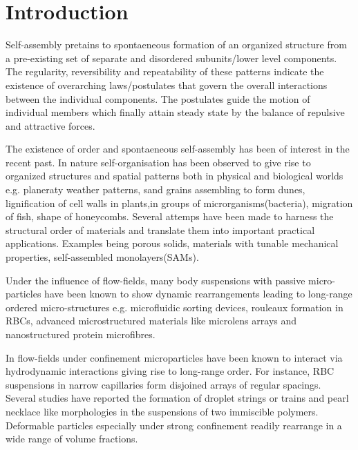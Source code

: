 \chapter{Introduction}

Self-assembly pretains to spontaeneous formation of an organized structure from a pre-existing set of separate and disordered subunits/lower level components. The regularity, reversibility\cite{Reference13} and repeatability of these patterns indicate the existence of overarching laws/postulates that govern the overall interactions between the individual components. The postulates guide the motion of individual members which finally attain steady state by the balance of repulsive and attractive forces\cite{Reference11}.   

The existence of order and spontaeneous self-assembly has been of interest in the recent past\cite{Reference1}. In nature self-organisation has been observed to give rise to organized structures and spatial patterns both in physical and biological worlds\cite{Reference5}\cite{Reference6} e.g. planeraty weather patterns\cite{Reference11}, sand grains assembling to form dunes, lignification of cell walls in plants\cite{Reference2}\cite{Reference3}\cite{Reference4},in groups of microrganisms(bacteria), migration of fish\cite{Reference5}\cite{Reference6}, shape of honeycombs\cite{Reference7}\cite{Reference8}. Several attemps have been made to harness the structural order of materials and translate them into important practical applications. Examples being porous solids, materials with tunable mechanical properties\cite{Reference9}\cite{Reference10}, self-assembled monolayers(SAMs)\cite{Reference34}\cite{Reference35}.

Under the influence of flow-fields, many body suspensions with passive micro-particles have been known to show dynamic rearrangements leading to long-range ordered micro-structures e.g. microfluidic sorting devices, rouleaux formation in RBCs\cite{Reference12}\cite{Reference14}, advanced microstructured materials like microlens arrays\cite{Reference36} and nanostructured protein microfibres\cite{Reference37}.

In flow-fields under confinement microparticles have been known to interact via hydrodynamic interactions giving rise to long-range order. For instance, RBC suspensions in narrow capillaries\cite{Reference28}\cite{Reference29} form disjoined arrays of regular spacings. Several studies have reported the formation of droplet strings or trains and pearl necklace like morphologies in the suspensions of two immiscible polymers\cite{Reference15}\cite{Reference16}. Deformable particles especially under strong confinement readily rearrange in a wide range of volume fractions\cite{Reference30}\cite{Reference31}.

